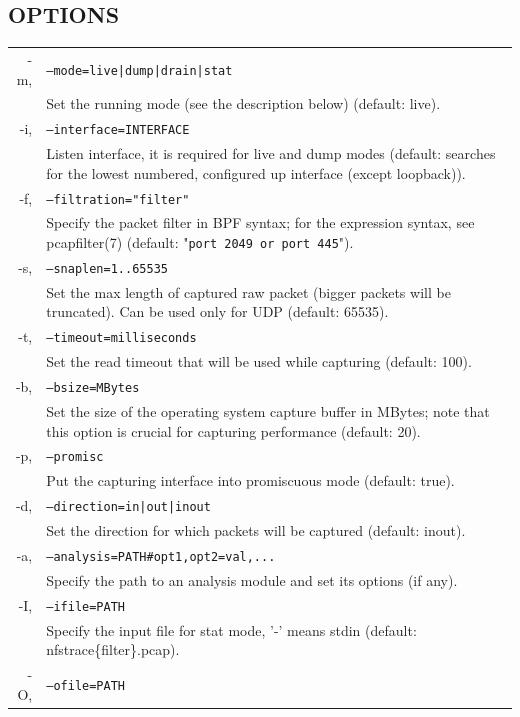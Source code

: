 \documentclass{article}
\newcommand*{\textfile}[1]{\textsf{#1}}
\newcommand*{\textprog}[1]{\textfile{#1}}
\newcommand{\code}[1]{\texttt{#1}}
\begin{document}
\subsection{OPTIONS}
\setlength\extrarowheight{3pt}
\begin{tabularx}{\linewidth}{ r X }
\textprog{-m}, & \code{--mode=live|dump|drain|stat} \\
 & Set the running mode (see the description below) (default: live).\\ 
\textprog{-i}, & \code{--interface=INTERFACE}\\
& Listen interface, it is required for live and dump modes (default: searches
for the lowest numbered, configured up interface (except loopback)).\\
\textprog{-f}, & \code{--filtration="filter"}\\
    & Specify the packet filter in \gls{BPF} syntax; for the expression syntax, see
pcapfilter(7) (default: "\code{port 2049 or port 445}").\\
\textprog{-s}, & \code{--snaplen=1..65535}\\
& Set the max length of captured raw packet (bigger packets will be truncated).
Can be used only for UDP (default: 65535).\\
\textprog{-t}, & \code{--timeout=milliseconds}\\
& Set the read timeout that will be used while capturing (default: 100).\\
\textprog{-b}, & \code{--bsize=MBytes}\\
& Set the size of the operating system capture buffer in MBytes; note that this
option is crucial for capturing performance (default: 20).\\
\textprog{-p}, & \code{--promisc}\\
& Put the capturing interface into promiscuous mode (default: true).\\
\textprog{-d}, & \code{--direction=in|out|inout}\\
& Set the direction for which packets will be captured (default: inout).\\
\textprog{-a}, & \code{--analysis=PATH\#opt1,opt2=val,...}\\
& Specify the path to an analysis module and set its options (if any).\\
\textprog{-I}, & \code{--ifile=PATH}\\
& Specify the input file for stat mode, '-' means stdin (default:
nfstrace\{filter\}.pcap).\\
\textprog{-O}, & \code{--ofile=PATH}\\

\end{tabularx}
\end{document}
